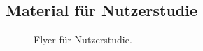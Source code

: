 \begin{appendices}

\chapter{Material für Nutzerstudie}
\label{appendix:study_material}

\begin{figure}[hbt]
    \centering
    \caption{Flyer für Nutzerstudie.}
\end{figure}


\end{appendices}
